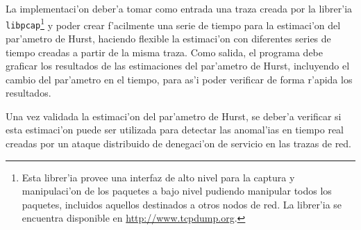 La implementaci'on deber'a tomar como entrada una traza creada por la librer'ia
{\tt libpcap}\footnote{Esta librer'ia provee una interfaz de alto nivel para la
captura y manipulaci'on de los paquetes a bajo nivel pudiendo manipular todos 
los paquetes, incluidos aquellos destinados a otros nodos de red. La librer'ia
se encuentra disponible en \url{http://www.tcpdump.org}.} y poder
crear f'acilmente una serie de tiempo para la estimaci'on del par'ametro de
Hurst, haciendo flexible la estimaci'on con diferentes series de tiempo creadas
a partir de la misma traza. Como salida, el programa debe graficar los
resultados de las estimaciones del par'ametro de Hurst, incluyendo el cambio del
par'ametro en el tiempo, para as'i poder verificar de forma r'apida los
resultados. 

Una vez validada la estimaci'on del par'ametro de Hurst, se deber'a verificar si
esta estimaci'on puede ser utilizada para detectar las anomal'ias en tiempo
real creadas por un ataque distribuido de denegaci'on de servicio en las trazas
de red.


